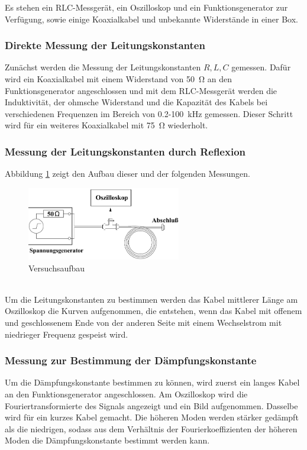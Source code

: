 Es stehen ein RLC-Messgerät, ein Oszilloskop und ein Funktionsgenerator zur Verfügung, sowie einige Koaxialkabel und unbekannte Widerstände in einer Box.
\subsubsection*{Direkte Messung der Leitungskonstanten}
Zunächst werden die Messung der Leitungskonstanten $R,L,C$ gemessen. Dafür wird ein Koaxialkabel mit einem Widerstand von \SI{50}{\ohm} an den Funktionsgenerator angeschlossen und mit dem RLC-Messgerät werden die Induktivität, der ohmsche Widerstand und die Kapazität des Kabels bei verschiedenen Frequenzen im Bereich von 0.2-\SI{100}{\kilo\hertz} gemessen. Dieser Schritt wird für ein weiteres Koaxialkabel mit \SI{75}{\ohm} wiederholt.
\subsubsection*{Messung der Leitungskonstanten durch Reflexion}
Abbildung \ref{fig:Aufbau} zeigt den Aufbau dieser und der folgenden Messungen.
\begin{figure}[h]
	\centering
	\includegraphics[width=0.6\textwidth]{Aufbau.pdf}
	\caption{Versuchsaufbau \cite{E2}}
	\label{fig:Aufbau}
\end{figure} \\
Um die Leitungskonstanten zu bestimmen werden das Kabel mittlerer Länge am Oszilloskop die Kurven aufgenommen, die entstehen, wenn das Kabel mit offenem und geschlossenem Ende von der anderen Seite mit einem Wechselstrom mit niedrieger Frequenz gespeist wird.

\subsubsection*{Messung zur Bestimmung der Dämpfungskonstante}
Um die Dämpfungskonstante bestimmen zu können, wird zuerst ein langes Kabel an den Funktionsgenerator angeschlossen. Am Oszilloskop wird die Fouriertransformierte des Signals angezeigt und ein Bild aufgenommen. Dasselbe wird für ein kurzes Kabel gemacht. Die höheren Moden werden stärker gedämpft als die niedrigen, sodass aus dem Verhältnis der Fourierkoeffizienten der höheren Moden die Dämpfungskonstante bestimmt werden kann.
